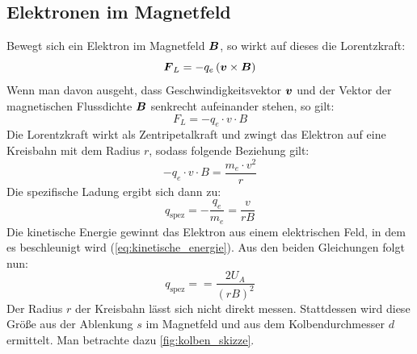 \documentclass[ngerman]{scrartcl}
\begin{document}
\subsection[Elektronen im Magnetfeld]{Elektronen im Magnetfeld \cite{ref:angabe_elektronen}}
\label{subsec:grundlagen_elektronen_im_magnetfeld}
%
Bewegt sich ein Elektron im Magnetfeld $\vb*{B}$, so wirkt auf dieses die Lorentzkraft:
%
\begin{equation}
    \label{eq:lorentzkraft}
    \vb*{F}_L = - q_e \left(\vb*{v} \times \vb*{B} \right)
\end{equation}
%
Wenn man davon ausgeht, dass Geschwindigkeitsvektor $\vb*{v}$ und der Vektor der magnetischen Flussdichte $\vb*{B}$ senkrecht aufeinander stehen, so gilt:
\begin{equation}
    \label{eq:lorentzkraft_orthogonal}
    F_L = -q_e \cdot v \cdot B
\end{equation}
%
Die Lorentzkraft wirkt als Zentripetalkraft und zwingt das Elektron auf eine Kreisbahn mit dem Radius $r$, sodass folgende Beziehung gilt:
\[-q_e \cdot v \cdot B = \frac{m_e \cdot v^2}{r}\]
Die spezifische Ladung ergibt sich dann zu:
\begin{equation}
    \label{eq:spezifische_ladung}
    q_{\text{spez}} = - \frac{q_e}{m_e} = \frac{v}{rB}
\end{equation}
Die kinetische Energie gewinnt das Elektron aus einem elektrischen Feld, in dem es beschleunigt wird (\autoref{eq:kinetische_energie}). Aus den beiden Gleichungen folgt nun:
\begin{equation}
    \label{eq:spezifische_ladung_U}
    q_{\text{spez}} = = \frac{2 U_A}{(rB)^2}
\end{equation}
Der Radius $r$ der Kreisbahn lässt sich nicht direkt messen. Stattdessen wird diese Größe aus der Ablenkung $s$ im Magnetfeld und aus dem Kolbendurchmesser $d$ ermittelt. Man betrachte dazu \autoref{fig:kolben_skizze}.
\end{document}
